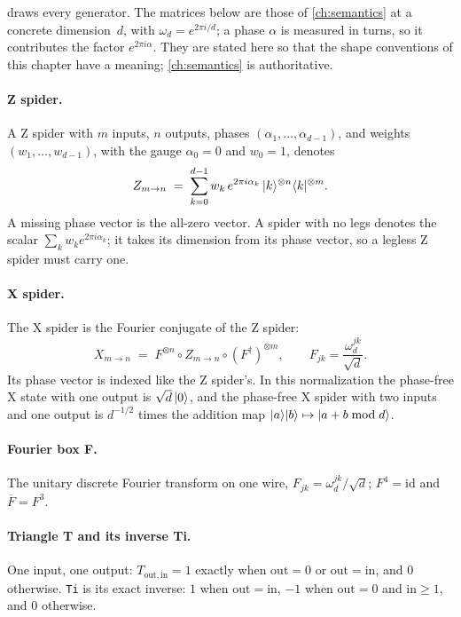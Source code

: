  draws every generator. The matrices below are those of \cref{ch:semantics} at a concrete dimension~$d$, with $\omega_d=e^{2\pi i/d}$; a phase $\alpha$ is measured in turns, so it contributes the factor $e^{2\pi i\alpha}$. They are stated here so that the shape conventions of this chapter have a meaning; \cref{ch:semantics} is authoritative.

\paragraph{Z spider.} A Z spider with $m$ inputs, $n$ outputs, phases $(\alpha_1,\dots,\alpha_{d-1})$, and weights $(w_1,\dots,w_{d-1})$, with the gauge $\alpha_0=0$ and $w_0=1$, denotes
\[
Z_{m\to n} \;=\; \sum_{k=0}^{d-1} w_k\, e^{2\pi i\alpha_k}\, \lvert k \rangle^{\otimes n}\langle k \rvert^{\otimes m}.
\]
A missing phase vector is the all-zero vector. A spider with no legs denotes the scalar $\sum_k w_k e^{2\pi i\alpha_k}$; it takes its dimension from its phase vector, so a legless Z spider must carry one.

\paragraph{X spider.} The X spider is the Fourier conjugate of the Z spider:
\[
X_{m\to n} \;=\; F^{\otimes n}\circ Z_{m\to n}\circ (F^{\dagger})^{\otimes m},\qquad F_{jk}=\frac{\omega_d^{jk}}{\sqrt d}.
\]
Its phase vector is indexed like the Z spider's. In this normalization the phase-free X state with one output is $\sqrt d\,\lvert 0 \rangle$, and the phase-free X spider with two inputs and one output is $d^{-1/2}$ times the addition map $\lvert a \rangle\lvert b \rangle\mapsto\lvert a+b \bmod d \rangle$.

\paragraph{Fourier box F.} The unitary discrete Fourier transform on one wire, $F_{jk}=\omega_d^{jk}/\sqrt d$; $F^4=\mathrm{id}$ and $\overline F=F^3$.

\paragraph{Triangle T and its inverse Ti.} One input, one output: $T_{\mathrm{out},\mathrm{in}}=1$ exactly when $\mathrm{out}=0$ or $\mathrm{out}=\mathrm{in}$, and $0$ otherwise. \texttt{Ti} is its exact inverse: $1$ when $\mathrm{out}=\mathrm{in}$, $-1$ when $\mathrm{out}=0$ and $\mathrm{in}\ge 1$, and $0$ otherwise.

